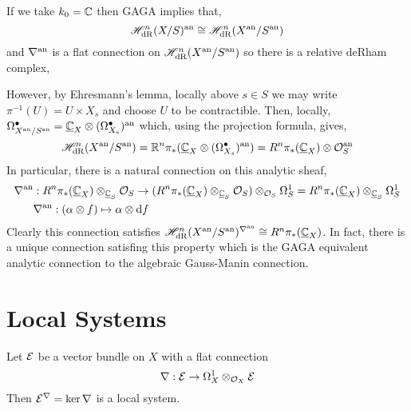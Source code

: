 \documentclass[12pt]{article}
\begin{document}
\begin{remark}
If we take $k_0 = \mathbb{C}$ then GAGA implies that,
\[ \mathscr{H}^n_{\mathrm{dR}}(X / S)^{\mathrm{an}} \cong \mathscr{H}^n_{\mathrm{dR}}(X^{\mathrm{an}} / S^{\mathrm{an}}) \]
and $\nabla^{\mathrm{an}}$ is a flat connection on $\mathscr{H}^n_{\mathrm{dR}}(X^{\mathrm{an}} / S^{\mathrm{an}})$ so there is a relative deRham complex,
\begin{center}
\end{center}
However, by Ehresmann's lemma, locally above $s \in S$ we may write $\pi^{-1}(U) = U \times X_s$ and choose $U$ to be contractible. Then, locally, $\Omega^\bullet_{X^{\mathrm{an}} / S^{\mathrm{an}}} = \underline{\mathbb{C}}_X \otimes (\Omega^\bullet_{X_s})^{\mathrm{an}}$ which, using the projection formula, gives,
\[ \mathscr{H}^n_{\mathrm{dR}}(X^{\mathrm{an}} / S^{\mathrm{an}}) = \mathbb{R}^n \pi_* (\underline{\mathbb{C}}_X \otimes (\Omega^\bullet_{X_s})^{\mathrm{an}}) = R^n \pi_*(\underline{\mathbb{C}}_X) \otimes \mathcal{O}_{S}^{\mathrm{an}} \] 
In particular, there is a natural connection on this analytic sheaf,
\begin{align*}
\nabla^{\mathrm{an}} & : R^n \pi_*(\underline{\mathbb{C}}_X) \otimes_{\underline{\mathbb{C}}_S} \mathcal{O}_{S} \to (R^n \pi_*(\underline{\mathbb{C}}_X) \otimes_{\underline{\mathbb{C}}_S} \mathcal{O}_{S}) \otimes_{\mathcal{O}_{S}} \Omega^1_S = R^n \pi_*(\underline{\mathbb{C}}_X) \otimes_{\underline{\mathbb{C}}_S} \Omega^1_S
\\
& \nabla^{\mathrm{an}} : (\alpha \otimes f) \mapsto \alpha \otimes \mathrm{d} f 
\end{align*}
Clearly this connection satisfies $\mathscr{H}^n_{\mathrm{dR}}(X^{\mathrm{an}} / S^{\mathrm{an}})^{\nabla^{\mathrm{an}}} \cong R^n \pi_*(\underline{\mathbb{C}}_X)$. In fact, there is a unique connection satisfing this property which is the GAGA equivalent analytic connection to the algebraic Gauss-Manin connection.
\end{remark}


\section{Local Systems}

\begin{proposition}
Let $\mathcal{E}$ be a vector bundle on $X$ with a flat connection 
\[ \nabla : \mathcal{E} \to \Omega^1_X \otimes_{\mathcal{O}_{X}} \mathcal{E}   \]
Then $\mathcal{E}^\nabla = \ker{\nabla}$ is a local system. 
\end{proposition}
\end{document}
